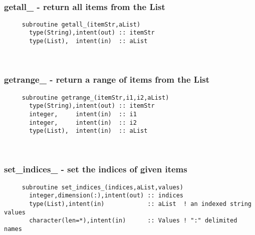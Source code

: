  
\mbox{}\hrulefill\ 
 

  \subsubsection{getall\_ - return all items from the List}

\begin{verbatim} 
     subroutine getall_(itemStr,aList)
       type(String),intent(out) :: itemStr
       type(List),  intent(in)  :: aList
 \end{verbatim} %
 
 
\mbox{}\hrulefill\ 
 
  \subsubsection{getrange\_ - return a range of items from the List}

\begin{verbatim} 
     subroutine getrange_(itemStr,i1,i2,aList)
       type(String),intent(out) :: itemStr
       integer,     intent(in)  :: i1
       integer,     intent(in)  :: i2
       type(List),  intent(in)  :: aList
 \end{verbatim} %
 
 
\mbox{}\hrulefill\ 
 
  \subsubsection{set\_indices\_ - set the indices of given items}

\begin{verbatim} 
     subroutine set_indices_(indices,aList,values)
       integer,dimension(:),intent(out) :: indices
       type(List),intent(in)            :: aList  ! an indexed string values
       character(len=*),intent(in)      :: Values ! ":" delimited names
 \end{verbatim} %

